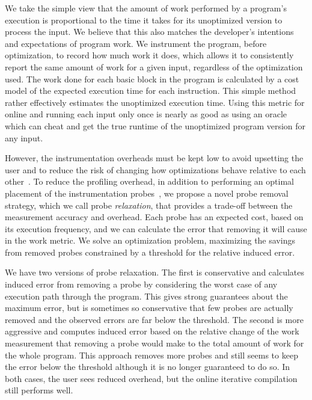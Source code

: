     We take the simple view that the amount of work performed by a program's execution is proportional to the time it takes for its
    unoptimized version to process the input. We believe that this also matches the developer's intentions and expectations of program
    work. We instrument the program, before optimization, to record how much work it does, which allows it to consistently report the same
    amount of work for a given input, regardless of the optimization used. The work done for each basic block in the
    program is calculated by a cost model of the expected execution time for each instruction. This simple method rather effectively
    estimates the unoptimized execution time. Using this metric for online {\itercomp} and running each input only once is nearly as good
    as using an oracle which can cheat and get the true runtime of the unoptimized program version for any input.

    However, the instrumentation overheads must be kept low to avoid upsetting the user and to reduce the risk of changing how
    optimizations behave relative to each other~\cite{forman81,anderson97,duesterwald00}. To reduce the profiling overhead, in addition to
    performing an optimal placement of the instrumentation probes~\cite{knuth73,forman81,ball94}, we propose a novel probe removal
    strategy, which we call probe \textit{relaxation}, that provides a trade-off between the measurement accuracy and overhead. Each probe
    has an expected cost, based on its execution frequency, and we can calculate the error that removing it will cause in the work metric.
    We solve an optimization problem, maximizing the savings from removed probes constrained by a threshold for the relative induced error.

    We have two versions of probe relaxation. The first is conservative and calculates induced error from removing a probe by considering
    the worst case of any execution path through the program. This gives strong guarantees about the maximum error, but is sometimes so
    conservative that few probes are actually removed and the observed errors are far below the threshold. The second is more aggressive
    and computes induced error based on the relative change of the work measurement that removing a probe would make to the total amount
    of work for the whole program. This approach removes more probes and still seems to keep the error below the threshold although it is
    no longer guaranteed to do so. In both cases, the user sees reduced overhead, but the online iterative compilation still performs well.

